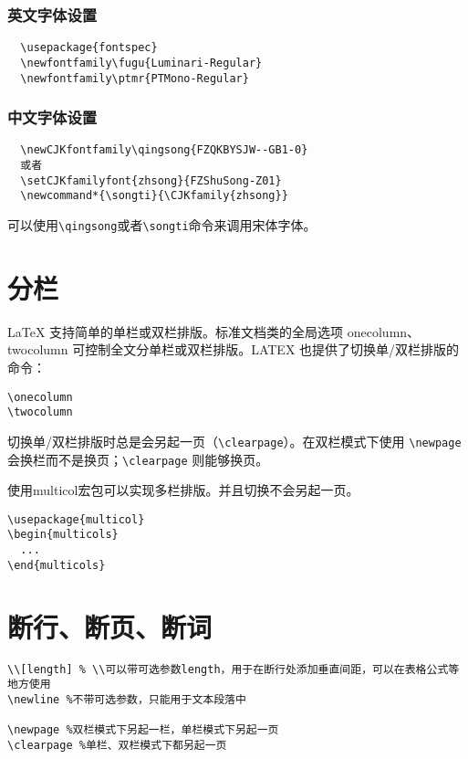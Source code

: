 \subsubsection{英文字体设置}
\begin{lstlisting}
  \usepackage{fontspec}
  \newfontfamily\fugu{Luminari-Regular}
  \newfontfamily\ptmr{PTMono-Regular}
\end{lstlisting}

\subsubsection{中文字体设置}
\begin{lstlisting}
  \newCJKfontfamily\qingsong{FZQKBYSJW--GB1-0}
  或者
  \setCJKfamilyfont{zhsong}{FZShuSong-Z01}
  \newcommand*{\songti}{\CJKfamily{zhsong}}
\end{lstlisting}

可以使用\lstinline|\qingsong|或者\lstinline{\songti}命令来调用宋体字体。


\section{分栏}\label{sec:columns}

\LaTeX{} 支持简单的单栏或双栏排版。标准文档类的全局选项 onecolumn、twocolumn 可控制全文分单栏或双栏排版。LATEX 也提供了切换单/双栏排版的命令：

\begin{lstlisting}
\onecolumn
\twocolumn
\end{lstlisting}

切换单/双栏排版时总是会另起一页（\lstinline{\clearpage}）。在双栏模式下使用 \lstinline{\newpage} 会换栏而不是换页；\lstinline{\clearpage} 则能够换页。

使用multicol宏包可以实现多栏排版。并且切换不会另起一页。

\begin{lstlisting}
\usepackage{multicol}
\begin{multicols}{2}
  ...
\end{multicols}
\end{lstlisting}

\section{断行、断页、断词}\label{sec:break}

\begin{lstlisting}
\\[length] % \\可以带可选参数length，用于在断行处添加垂直间距，可以在表格公式等地方使用
\newline %不带可选参数，只能用于文本段落中

\newpage %双栏模式下另起一栏，单栏模式下另起一页
\clearpage %单栏、双栏模式下都另起一页
\end{lstlisting}


